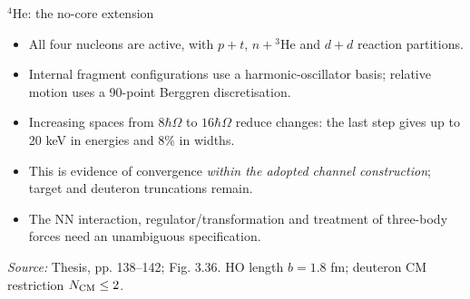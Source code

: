 \documentclass[aspectratio=169,11pt]{beamer}
\newcommand{\nuc}[2]{\ensuremath{{}^{#1}\mathrm{#2}}}
\newcommand{\src}[1]{\par\vfill{\color{muted}\fontsize{7.5}{9}\selectfont\textit{Source:} #1\par}}
\begin{document}
\begin{frame}{\nuc{4}{He}: the no-core extension}
\begin{itemize}\setlength\itemsep{3mm}
\item All four nucleons are active, with $p+t$, $n+\nuc{3}{He}$ and $d+d$ reaction partitions.
\item Internal fragment configurations use a harmonic-oscillator basis; relative motion uses a 90-point Berggren discretisation.
\item Increasing spaces from $8\hbar\Omega$ to $16\hbar\Omega$ reduce changes: the last step gives up to 20 keV in energies and 8\% in widths.
\item This is evidence of convergence \emph{within the adopted channel construction}; target and deuteron truncations remain.
\item The NN interaction, regulator/transformation and treatment of three-body forces need an unambiguous specification.
\end{itemize}
\src{Thesis, pp. 138--142; Fig. 3.36. HO length $b=1.8$ fm; deuteron CM restriction $N_{\rm CM}\leq2$.}
\end{frame}
\end{document}
